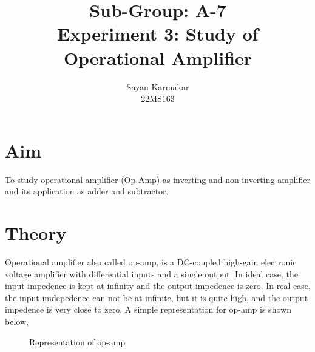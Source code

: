 \documentclass[12pt]{article}
\begin{document}
\title{Sub-Group: A-7 \\ Experiment 3: Study of Operational Amplifier}


\author{Sayan Karmakar \\22MS163 }
\date{}
\maketitle

\section{Aim}
To study operational amplifier (Op-Amp) as inverting and non-inverting amplifier and its application as adder and subtractor.

\section{Theory}
Operational amplifier also called op-amp, is a DC-coupled high-gain electronic voltage amplifier with differential inputs and a single output. In ideal case, the input impedence is kept at infinity and the output impedence is zero. In real case, the input imdepedence can not be at infinite, but it is quite high, and the output impedence is very close to zero. A simple representation for op-amp is shown below,
\begin{figure}[H]
       \centering
    \label{fig:OA_symbol}
    \caption{Representation of op-amp}
\end{figure}
\end{document}
